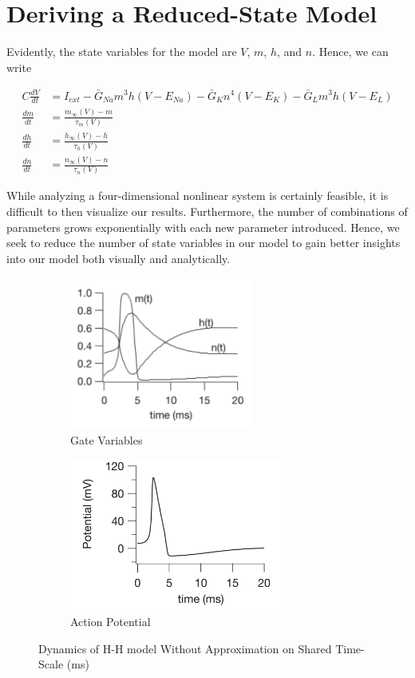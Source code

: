 \documentclass{article}
\begin{document}
\section{Deriving a Reduced-State Model}

Evidently, the state variables for the model are $V$, $m$, $h$, and $n$. Hence, we can write

\begin{align*}
    C\frac{dV}{dt} &= I_{ext} -\bar{G}_{Na}m^3h(V-E_{Na}) -\bar{G}_{K}n^4(V-E_{K})  -\bar{G}_{L}m^3h(V-E_{L}) \\
    \frac{dm}{dt} &= \frac{m_{\infty}(V)-m}{\tau_m(V)} \\
    \frac{dh}{dt} &= \frac{h_{\infty}(V)-h}{\tau_h(V)} \\
    \frac{dn}{dt} &= \frac{n_{\infty}(V)-n}{\tau_n(V)} 
\end{align*}

While analyzing a four-dimensional nonlinear system is certainly feasible, it is difficult to then visualize our results. Furthermore, the number of combinations of parameters grows exponentially with each new parameter introduced. Hence, we seek to reduce the number of state variables in our model to gain better insights into our model both visually and analytically. 

\begin{figure}[h]
\centering
\begin{subfigure}{.5\textwidth}
	\centering
	\includegraphics[height=5cm]{keener1.png}
	\caption{Gate Variables}
\end{subfigure}%
\begin{subfigure}{.5\textwidth}
	\centering
	\includegraphics[height=5cm]{keener2.png}
	\caption{Action Potential}
\end{subfigure}
	\caption{Dynamics of H-H model Without Approximation on Shared Time-Scale (ms)}
	\label{fig:keen}
\end{figure}
\end{document}
